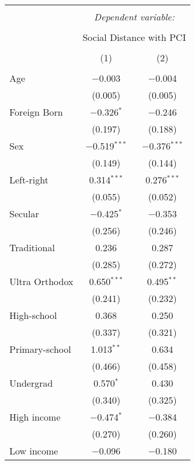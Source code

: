 \documentclass[12pt,letterpaper]{article}
\begin{document}
\begin{table}[!htbp] \centering 
	\footnotesize
	\setlength{\tabcolsep}{4pt} %
	\caption{} 
	\label{} 
	\begin{tabular}{@{\extracolsep{5pt}}lcc} 
		\\[-1.8ex]\hline 
		\hline \\[-1.8ex] 
		& \multicolumn{2}{c}{\textit{Dependent variable:}} \\ 
		\cline{2-3} 
		\\[-1.8ex] & \multicolumn{2}{c}{Social Distance with PCI} \\ 
		\\[-1.8ex] & (1) & (2)\\ 
		\hline \\[-1.8ex] 
		Age & $-$0.003 & $-$0.004 \\ 
		& (0.005) & (0.005) \\ 
		Foreign Born & $-$0.326$^{*}$ & $-$0.246 \\ 
		& (0.197) & (0.188) \\ 
		Sex & $-$0.519$^{***}$ & $-$0.376$^{***}$ \\ 
		& (0.149) & (0.144) \\ 
		Left-right & 0.314$^{***}$ & 0.276$^{***}$ \\ 
		& (0.055) & (0.052) \\ 
		Secular & $-$0.425$^{*}$ & $-$0.353 \\ 
		& (0.256) & (0.246) \\ 
		Traditional & 0.236 & 0.287 \\ 
		& (0.285) & (0.272) \\ 
		Ultra Orthodox & 0.650$^{***}$ & 0.495$^{**}$ \\ 
		& (0.241) & (0.232) \\ 
		High-school & 0.368 & 0.250 \\ 
		& (0.337) & (0.321) \\ 
		Primary-school & 1.013$^{**}$ & 0.634 \\ 
		& (0.466) & (0.458) \\ 
		Undergrad & 0.570$^{*}$ & 0.430 \\ 
		& (0.340) & (0.325) \\ 
		High income & $-$0.474$^{*}$ & $-$0.384 \\ 
		& (0.270) & (0.260) \\ 
		Low income & $-$0.096 & $-$0.180 \\ 

\end{tabular}
\end{table}
\end{document}

